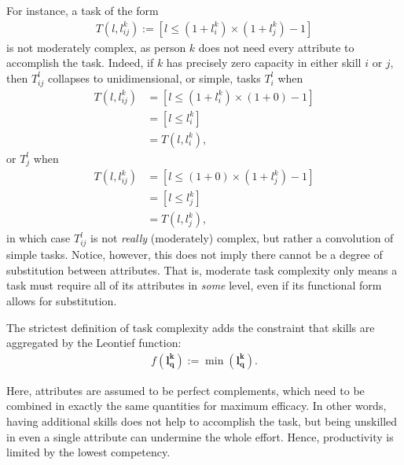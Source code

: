\documentclass[hidelinks, nonatbib]{elsarticle}
\begin{document}
\begin{definition}
\begin{subdefinition}
        For instance, a task of the form
    \begin{gather}
        T(l, l_{ij}^{k})
        := [l \leq (1 + l_{i}^{k}) \times (1 + l_{j}^{k}) - 1]
    \end{gather}
    is not moderately complex, as person $k$ does not need every attribute to accomplish the task. Indeed, if $k$ has precisely zero capacity in either skill $i$ or $j$, then $T_{ij}^{l}$ collapses to unidimensional, or simple, tasks $T_{i}^{l}$ when
    \begin{align}
        T(l, l_{ij}^{k})
        &= [l \leq (1 + l_{i}^{k}) \times (1 + 0) - 1]
        \\
        &= [l \leq l_{i}^{k}]
        \\
        &= T(l, l_{i}^{k})
        ,
    \end{align}
    or $T_{j}^{l}$ when
    \begin{align}
        T(l, l_{ij}^{k})
        &= [l \leq (1 + 0) \times (1 + l_{j}^{k}) - 1]
        \\
        &= [l \leq l_{j}^{k}]
        \\
        &= T(l, l_{j}^{k})
        ,
    \end{align}
    in which case $T_{ij}^{l}$ is not \textit{really} (moderately) complex, but rather a convolution of simple tasks. Notice, however, this does not imply there cannot be a degree of substitution between attributes. That is, moderate task complexity only means a task must require all of its attributes in \textit{some} level, even if its functional form allows for substitution.
    
    \end{subdefinition}
    
    \begin{subdefinition}
        The strictest definition of task complexity adds the constraint that skills are aggregated by the Leontief function:
        \begin{gather}
            f(\boldsymbol{l_{q}^{k}})
            := 
            \min(\boldsymbol{l_{q}^{k}})
            .
        \end{gather}

        Here, attributes are assumed to be perfect complements, which need to be combined in exactly the same quantities for maximum efficacy. In other words, having additional skills does not help to accomplish the task, but being unskilled in even a single attribute can undermine the whole effort. Hence, productivity is limited by the lowest competency.
    \end{subdefinition}

\end{definition}
\end{document}
